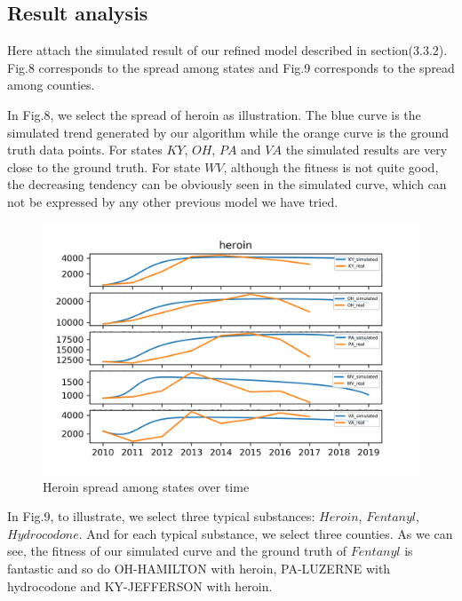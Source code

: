 \documentclass[12pt]{article}
\begin{document}
\subsection{Result analysis}
Here attach the simulated result of our refined model described in section(3.3.2). Fig.8 corresponds to the spread among states and Fig.9 corresponds to the spread among counties.

In Fig.8, we select the spread of heroin as illustration. The blue curve is the simulated trend generated by our algorithm while the orange curve is the ground truth data points. For states $KY$, $OH$, $PA$ and $VA$ the simulated results are very close to the ground truth. For state $WV$, although the fitness is not quite good, the decreasing tendency can be obviously seen in the simulated curve, which can not be expressed by any other previous model we have tried.

\begin{figure}[!htbp]
\centering
\includegraphics[width=16cm]{Fig/heroin_states_simul}
\caption{Heroin spread among states over time}
\end{figure}

In Fig.9, to illustrate, we select three typical substances: $Heroin$, $Fentanyl$, $Hydrocodone$. And for each typical substance, we select three counties. As we can see, the fitness of our simulated curve and the ground truth of $Fentanyl$ is fantastic and so do OH-HAMILTON with heroin, PA-LUZERNE with hydrocodone and KY-JEFFERSON with heroin.
\end{document}
